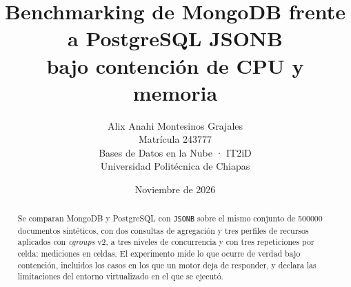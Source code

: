 \documentclass[11pt,a4paper,titlepage]{article}   %
\title{\textbf{Benchmarking de MongoDB frente a PostgreSQL JSONB\\bajo contención de CPU y memoria}}
\author{Alix Anahi Montesinos Grajales\\[2pt]
        \small Matrícula 243777\\[6pt]
        \small Bases de Datos en la Nube · IT2iD\\
        \small Universidad Politécnica de Chiapas}
\date{Noviembre de 2026}
\begin{document}
\maketitle

\begin{abstract}
\noindent
Se comparan MongoDB y PostgreSQL con \texttt{JSONB} sobre el mismo conjunto de
\num{500000} documentos sintéticos, con dos consultas de agregación y tres
perfiles de recursos aplicados con \emph{cgroups} v2, a tres niveles de
concurrencia y con tres repeticiones por celda: \cifraFilasCsv{} mediciones en
\cifraCeldas{} celdas. El experimento mide lo que ocurre de verdad bajo
contención, incluidos los casos en los que un motor deja de responder, y declara
las limitaciones del entorno virtualizado en el que se ejecutó.
\end{abstract}
\newpage

\tableofcontents
\newpage









\appendix


\end{document}
